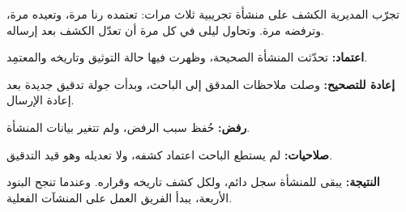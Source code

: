 \begin{rcnote}
تجرّب المديرية الكشف على منشأة تجريبية ثلاث مرات: تعتمده رنا مرة، وتعيده مرة، وترفضه مرة. وتحاول ليلى في كل مرة أن تعدّل الكشف بعد إرساله.
\end{rcnote}

\begin{rcchecklist}
\begin{checklist}
  \item \textbf{اعتماد:} تحدّثت المنشأة الصحيحة، وظهرت فيها حالة التوثيق وتاريخه والمعتمِد.
  \item \textbf{إعادة للتصحيح:} وصلت ملاحظات المدقق إلى الباحث، وبدأت جولة تدقيق جديدة بعد إعادة الإرسال.
  \item \textbf{رفض:} حُفظ سبب الرفض، ولم تتغير بيانات المنشأة.
  \item \textbf{صلاحيات:} لم يستطع الباحث اعتماد كشفه، ولا تعديله وهو قيد التدقيق.
\end{checklist}
\end{rcchecklist}

\textbf{النتيجة:} يبقى للمنشأة سجل دائم، ولكل كشف تاريخه وقراره. وعندما تنجح البنود الأربعة، يبدأ الفريق العمل على المنشآت الفعلية.
